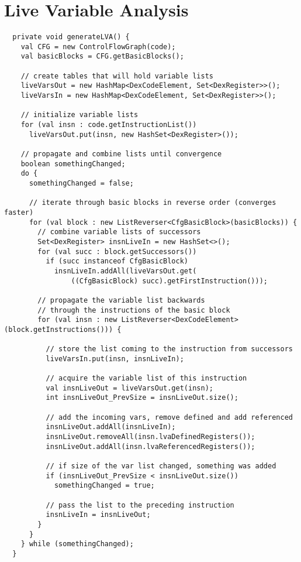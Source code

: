 \section{Live Variable Analysis}

\begin{lstlisting}
  private void generateLVA() {
    val CFG = new ControlFlowGraph(code);
    val basicBlocks = CFG.getBasicBlocks();

    // create tables that will hold variable lists
    liveVarsOut = new HashMap<DexCodeElement, Set<DexRegister>>();
    liveVarsIn = new HashMap<DexCodeElement, Set<DexRegister>>();
    
    // initialize variable lists
    for (val insn : code.getInstructionList())
      liveVarsOut.put(insn, new HashSet<DexRegister>());

    // propagate and combine lists until convergence
    boolean somethingChanged;
    do {
      somethingChanged = false;

      // iterate through basic blocks in reverse order (converges faster)
      for (val block : new ListReverser<CfgBasicBlock>(basicBlocks)) {
        // combine variable lists of successors   
        Set<DexRegister> insnLiveIn = new HashSet<>();
        for (val succ : block.getSuccessors())
          if (succ instanceof CfgBasicBlock)
            insnLiveIn.addAll(liveVarsOut.get(
            	((CfgBasicBlock) succ).getFirstInstruction()));

        // propagate the variable list backwards 
        // through the instructions of the basic block 
        for (val insn : new ListReverser<DexCodeElement>(block.getInstructions())) {
        	
          // store the list coming to the instruction from successors
          liveVarsIn.put(insn, insnLiveIn);

          // acquire the variable list of this instruction  
          val insnLiveOut = liveVarsOut.get(insn);
          int insnLiveOut_PrevSize = insnLiveOut.size();

          // add the incoming vars, remove defined and add referenced
          insnLiveOut.addAll(insnLiveIn);
          insnLiveOut.removeAll(insn.lvaDefinedRegisters());
          insnLiveOut.addAll(insn.lvaReferencedRegisters());

          // if size of the var list changed, something was added
          if (insnLiveOut_PrevSize < insnLiveOut.size())
            somethingChanged = true;

          // pass the list to the preceding instruction
          insnLiveIn = insnLiveOut;
        }
      }
    } while (somethingChanged);
  }
\end{lstlisting}

